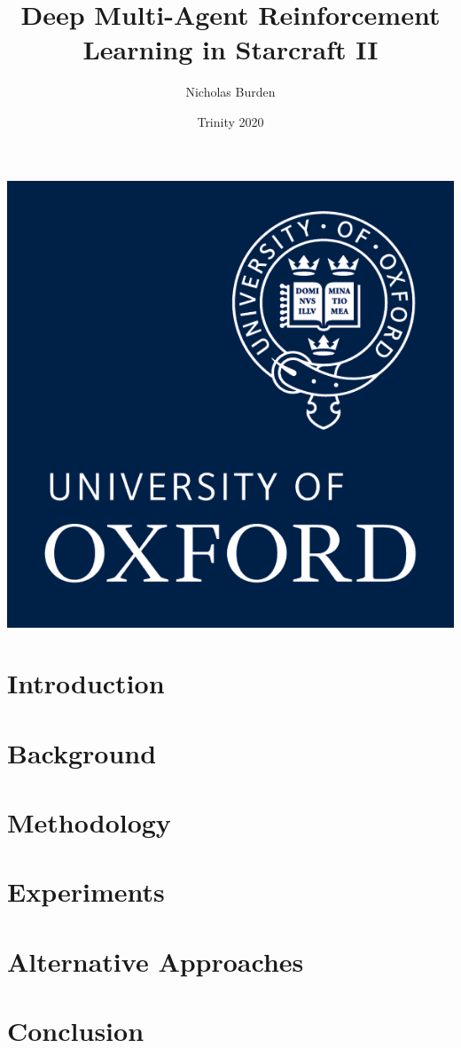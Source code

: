 \documentclass{article}
\title{Deep Multi-Agent Reinforcement Learning in Starcraft II}
\author{Nicholas Burden}
\date{Trinity 2020}
\begin{document}
\maketitle
\thispagestyle{empty}
\vfill
\vfill
\begin{center}
    \includegraphics[scale=0.2]{images/ox_logo.png}
\end{center}

\newpage


\begin{abstract}
    
\end{abstract}
\newpage
\tableofcontents
\newpage
\section{Introduction}


\section{Background}


\section{Methodology}


\section{Experiments}


\section{Alternative Approaches}


\section{Conclusion}




\end{document}
